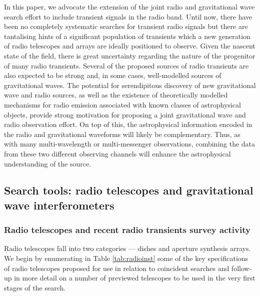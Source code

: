 \documentclass[epsf]{article}
\begin{document}
In this paper, we advocate the extension of the joint radio and
gravitational wave search effort to include transient signals in the
radio band.  Until now, there have been no completely systematic searches for transient radio
signals but there are tantalising hints of a significant population of transients
\cite{Lazio:2009xe} which a new generation of radio telescopes and
arrays are ideally positioned to observe.  Given the nascent state of
the field, there is great uncertainty regarding the nature of the progenitor of 
many radio transients. Several of the proposed sources of radio transients are
also expected to be strong and, in some cases, well-modelled sources of 
gravitational waves.  The potential for serendipitous discovery
of new gravitational wave and radio sources, as well as the existence of 
theoretically modelled mechanisms for radio emission associated with known classes of
astrophysical objects, provide strong motivation for proposing a joint
gravitational wave and radio observation effort. On top of this, the astrophysical 
information encoded in the radio and gravitational waveforms will likely be complementary.
Thus, as with many multi-wavelength or multi-messenger observations,
combining the data from these two different observing channels will
enhance the astrophysical understanding of the source.

\subsection{Search tools: radio telescopes and gravitational wave interferometers}
\label{sec:telescopes}

\subsubsection{Radio telescopes and recent radio transients survey activity}
\label{ssec:radio_tele}

Radio telescopes fall into two categories --- dishes and aperture
synthesis arrays. We begin by enumerating in Table \ref{tab:radioinst}
some of the key specifications of radio telescopes proposed for use in
relation to coincident searches and follow-up in more detail on
a number of previewed telescopes to be used in the very first stages of
the search.
\end{document}
